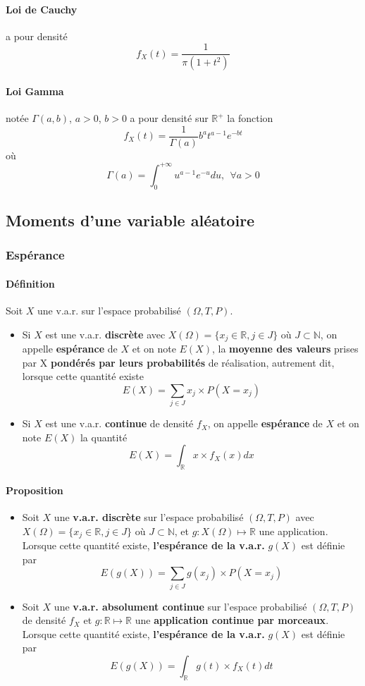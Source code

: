 \documentclass[10pt,a4paper,twoside]{article}
\begin{document}
\paragraph{Loi de Cauchy} a pour densité
$$f_{X}(t)=\frac{1}{\pi(1+t^{2})}$$

\paragraph{Loi Gamma} notée $\Gamma(a,b)$, $a>0$, $b>0$ a pour densité sur $\mathbb{R}^{+}$ la fonction
$$f_{X}(t) = \frac{1}{\Gamma(a)}b^{a}t^{a-1}e^{-bt}$$
où
$$\Gamma(a) = \int_{0}^{+\infty}u^{a-1}e^{-u}du,\ \ \forall a >0$$

\subsection{Moments d'une variable aléatoire}
\subsubsection{Espérance}
\paragraph{Définition} Soit $X$ une v.a.r. sur l'espace probabilisé $(\Omega,T,P)$.
\begin{itemize}
\item Si $X$ est une v.a.r. \textbf{discrète} avec $X(\Omega)=\{x_{j}\in \mathbb{R}, j \in J\}$ où $J\subset \mathbb{N}$, on appelle \textbf{espérance} de $X$ et on note $E(X)$, la \textbf{moyenne des valeurs} prises par X \textbf{pondérés par leurs probabilités} de réalisation, autrement dit, lorsque cette quantité existe
$$E(X)=\sum_{j\in J}x_{j}\times P(X=x_{j})$$
\item Si $X$ est une v.a.r. \textbf{continue} de densité $f_{X}$, on appelle \textbf{espérance} de $X$ et on note $E(X)$ la quantité
$$E(X)=\int_{\mathbb{R}}x\times f_{X}(x) dx$$
\end{itemize}

\paragraph{Proposition}
\begin{itemize}
\item Soit $X$ une \textbf{v.a.r. discrète} sur l'espace probabilisé $(\Omega,T,P)$ avec $X(\Omega)=\{x_{j}\in \mathbb{R}, j\in J\}$ où $J\subset \mathbb{N}$, et $g:X(\Omega)\mapsto \mathbb{R}$ une application. Lorsque cette quantité existe, \textbf{l'espérance de la v.a.r.} $g(X)$ est définie par
$$E(g(X)) = \sum_{j\in J}g(x_{j})\times P(X=x_{j})$$
\item Soit $X$ une \textbf{v.a.r. absolument continue} sur l'espace probabilisé $(\Omega,T,P)$ de densité $f_{X}$ et $g:\mathbb{R}\mapsto \mathbb{R}$ une \textbf{application continue par morceaux}. Lorsque cette quantité existe, \textbf{l'espérance de la v.a.r.} $g(X)$ est définie par
$$E(g(X))=\int_{\mathbb{R}}g(t)\times f_{X}(t) dt$$
\end{itemize}
\end{document}
